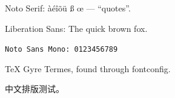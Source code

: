 \documentclass{article}
\begin{document}
Noto Serif: àéîõü ß œ — “quotes”.

\textsf{Liberation Sans: The quick brown fox.}

\texttt{Noto Sans Mono: 0123456789}

{\gyre TeX Gyre Termes, found through fontconfig.}

中文排版测试。
\end{document}
